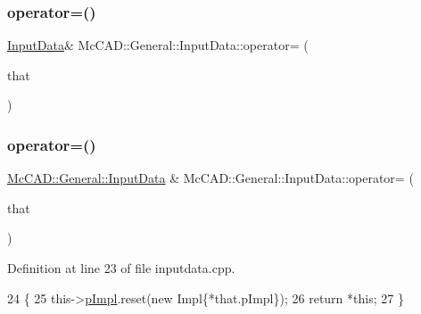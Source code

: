 \subsubsection{\texorpdfstring{operator=()}{operator=()}\hspace{0.1cm}{\footnotesize\ttfamily [1/4]}}
{\footnotesize\ttfamily \hyperlink{classMcCAD_1_1General_1_1InputData}{Input\+Data}\& Mc\+C\+A\+D\+::\+General\+::\+Input\+Data\+::operator= (\begin{DoxyParamCaption}\item[{const \hyperlink{classMcCAD_1_1General_1_1InputData}{Input\+Data} \&}]{that }\end{DoxyParamCaption})}

\mbox{\label{classMcCAD_1_1General_1_1InputData_ae8cb358b1e230307dec893a5ec6490af}} 
\subsubsection{\texorpdfstring{operator=()}{operator=()}\hspace{0.1cm}{\footnotesize\ttfamily [2/4]}}
{\footnotesize\ttfamily \hyperlink{classMcCAD_1_1General_1_1InputData}{Mc\+C\+A\+D\+::\+General\+::\+Input\+Data} \& Mc\+C\+A\+D\+::\+General\+::\+Input\+Data\+::operator= (\begin{DoxyParamCaption}\item[{const \hyperlink{classMcCAD_1_1General_1_1InputData}{Input\+Data} \&}]{that }\end{DoxyParamCaption})}



Definition at line 23 of file inputdata.\+cpp.


\begin{DoxyCode}
24                               \{
25     this->\hyperlink{classMcCAD_1_1General_1_1InputData_a6a636f3d471d293dcb12c59d29af50c9}{pImpl}.reset(\textcolor{keyword}{new} Impl\{*that.pImpl\});
26     \textcolor{keywordflow}{return} *\textcolor{keyword}{this};
27 \}
\end{DoxyCode}
\mbox{\label{classMcCAD_1_1General_1_1InputData_ac9d4a0a6caf1f89ed09ddbd700bcb6ae}} 
